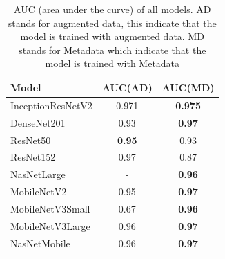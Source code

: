 \documentclass[sensors,article,submit,pdftex,moreauthors]{Definitions/mdpi}
\begin{document}
\begin{table}[H]
	\centering
	\begin{tabular}{| l | c  c | }
		\hline
		Model & AUC(AD) & AUC(MD)\\ 
		\hline
		InceptionResNetV2 & 0.971 & \textbf{0.975}\\
		\hline
		DenseNet201 & 0.93 & \textbf{0.97}\\
		\hline
		ResNet50 & \textbf{0.95} & 0.93 \\
		\hline
		ResNet152 & 0.97 & 0.87\\
		\hline
		NasNetLarge & - & \textbf{0.96}\\
		\hline
		MobileNetV2 & 0.95 & \textbf{0.97}\\
		\hline
		MobileNetV3Small & 0.67 & \textbf{0.96}\\
		\hline
		MobileNetV3Large & 0.96 & \textbf{0.97}\\
		\hline
		NasNetMobile & 0.96 & \textbf{0.97}\\
		\hline
	\end{tabular}
	\caption{AUC (area under the curve) of all models. AD stands for augmented data, this indicate that the model is trained with augmented data. MD stands for Metadata which indicate that the model is trained with Metadata}
	\label{table:overall-auc}
\end{table}
\end{document}

